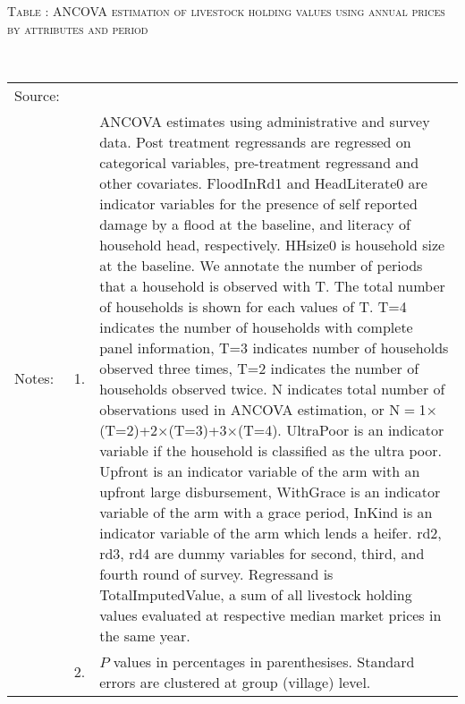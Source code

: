 \hspace{-1cm}\begin{minipage}[t]{14cm}
\hfil\textsc{\normalsize Table \thetable: ANCOVA estimation of livestock holding values using annual prices by attributes and period\label{tab ANCOVA livestock  annual price timevarying attributes}}\\
\setlength{\tabcolsep}{1pt}
\setlength{\baselineskip}{8pt}
\renewcommand{\arraystretch}{.55}
\hfil{}\\
\renewcommand{\arraystretch}{.8}
\setlength{\tabcolsep}{1pt}
\begin{tabular}{>{\hfill\scriptsize}p{1cm}<{}>{\hfill\scriptsize}p{.25cm}<{}>{\scriptsize}p{12cm}<{\hfill}}
Source:& \multicolumn{2}{l}{\scriptsize Estimated with GUK administrative and survey data.}\\
Notes: & 1. & ANCOVA estimates using administrative and survey data. Post treatment regressands are regressed on categorical variables, pre-treatment regressand and other covariates. \textsf{FloodInRd1} and \textsf{HeadLiterate0} are indicator variables for the presence of self reported damage by a flood at the baseline, and literacy of household head, respectively. \textsf{HHsize0} is household size at the baseline. We annotate the number of periods that a household is observed with \textsf{T}. The total number of households is shown for each values of \textsf{T}. \textsf{T=4} indicates the number of households with complete panel information, \textsf{T=3} indicates number of households observed three times, \textsf{T=2} indicates the number of households observed twice. \textsf{N} indicates total number of observations used in ANCOVA estimation, or \textsf{N$=$1$\times$(T=2)+2$\times$(T=3)+3$\times$(T=4)}.  \textsf{UltraPoor} is an indicator variable if the household is classified as the ultra poor. \textsf{Upfront} is an indicator variable of the arm with an upfront large disbursement, \textsf{WithGrace} is an indicator variable of the arm with a grace period, \textsf{InKind} is an indicator variable of the arm which lends a heifer. \textsf{rd2, rd3, rd4} are dummy variables for second, third, and fourth round of survey. Regressand is \textsf{TotalImputedValue}, a sum of all livestock holding values evaluated at respective median market prices in the same year. \\
& 2. & $P$ values in percentages in parenthesises. Standard errors are clustered at group (village) level.
\end{tabular}
\end{minipage}


